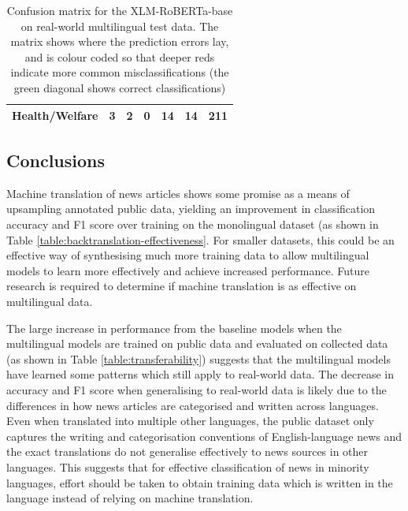 \documentclass{l4proj}
\begin{document}
\begin{table}[]
\begin{tabular}{lllllll}
\textbf{Health/Welfare}                   & \cellcolor[HTML]{FFCCC9}3            & \cellcolor[HTML]{FFCCC9}2            & 0                                    & \cellcolor[HTML]{FD6864}14           & \cellcolor[HTML]{FD6864}14           & \cellcolor[HTML]{67FD9A}\textbf{211} \\ \hline
\end{tabular}
\caption{Confusion matrix for the XLM-RoBERTa-base on real-world multilingual test data. The matrix shows where the prediction errors lay, and is colour coded so that deeper reds indicate more common misclassifications (the green diagonal shows correct classifications)}
\label{table:confusion_matrix}
\end{table}

\subsection{Conclusions}
Machine translation of news articles shows some promise as a means of upsampling annotated public data, yielding an improvement in classification accuracy and F1 score over training on the monolingual dataset (as shown in Table \ref{table:backtranslation-effectiveness}. For smaller datasets, this could be an effective way of synthesising much more training data to allow multilingual models to learn more effectively and achieve increased performance. Future research is required to determine if machine translation is as effective on multilingual data. \par
The large increase in performance from the baseline models when the multilingual models are trained on public data and evaluated on collected data (as shown in Table \ref{table:transferability}) suggests that the multilingual models have learned some patterns which still apply to real-world data. The decrease in accuracy and F1 score when generalising to real-world data is likely due to the differences in how news articles are categorised and written across languages. Even when translated into multiple other languages, the public dataset only captures the writing and categorisation conventions of English-language news and the exact translations do not generalise effectively to news sources in other languages. This suggests that for effective classification of news in minority languages, effort should be taken to obtain training data which is written in the language instead of relying on machine translation. \par
\end{document}

